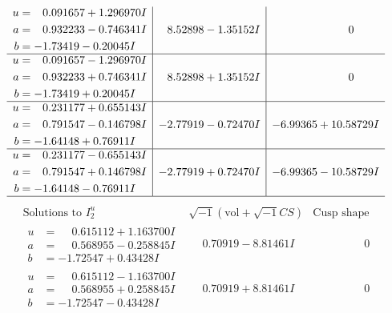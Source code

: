 \documentclass[1p]{elsarticle_modified}
\theoremstyle{definition}
\newcommand{\I}{\sqrt{-1}}
\begin{document}
$$\begin{array}{c|c|c}
\begin{aligned}
u &= \phantom{-}0.091657 + 1.296970 I \\
a &= \phantom{-}0.932233 - 0.746341 I \\
b &= -1.73419 - 0.20045 I\end{aligned}
 & \phantom{-}8.52898 - 1.35152 I & \phantom{-0.000000 } 0 \\ \hline\begin{aligned}
u &= \phantom{-}0.091657 - 1.296970 I \\
a &= \phantom{-}0.932233 + 0.746341 I \\
b &= -1.73419 + 0.20045 I\end{aligned}
 & \phantom{-}8.52898 + 1.35152 I & \phantom{-0.000000 } 0 \\ \hline\begin{aligned}
u &= \phantom{-}0.231177 + 0.655143 I \\
a &= \phantom{-}0.791547 - 0.146798 I \\
b &= -1.64148 + 0.76911 I\end{aligned}
 & -2.77919 - 0.72470 I & -6.99365 + 10.58729 I \\ \hline\begin{aligned}
u &= \phantom{-}0.231177 - 0.655143 I \\
a &= \phantom{-}0.791547 + 0.146798 I \\
b &= -1.64148 - 0.76911 I\end{aligned}
 & -2.77919 + 0.72470 I & -6.99365 - 10.58729 I\\
 \hline 
 \end{array}$$\newpage$$\begin{array}{c|c|c}  
\text{Solutions to }I^u_{2}& \I (\text{vol} + \sqrt{-1}CS) & \text{Cusp shape}\\
 \hline 
\begin{aligned}
u &= \phantom{-}0.615112 + 1.163700 I \\
a &= \phantom{-}0.568955 - 0.258845 I \\
b &= -1.72547 + 0.43428 I\end{aligned}
 & \phantom{-}0.70919 - 8.81461 I & \phantom{-0.000000 } 0 \\ \hline\begin{aligned}
u &= \phantom{-}0.615112 - 1.163700 I \\
a &= \phantom{-}0.568955 + 0.258845 I \\
b &= -1.72547 - 0.43428 I\end{aligned}
 & \phantom{-}0.70919 + 8.81461 I & \phantom{-0.000000 } 0 \\ \hline\begin{aligned}

\end{aligned}
\end{array}$$
\end{document}
